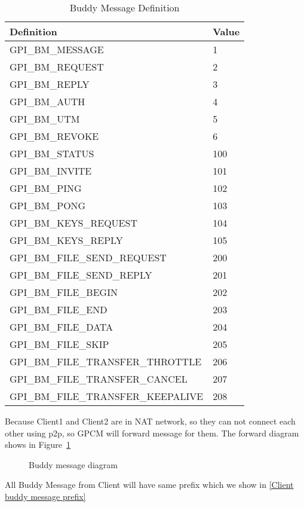 \documentclass[oneside,titlepage,a4paper]{Definition/retrospy} %
\begin{document}
\begin{table}[H]
	\centering
	\begin{tabular}{|l|l|}
		\hline 
		\textbf{Definition}&\textbf{Value} \\ 
		\hline 
 GPI\_BM\_MESSAGE&            1\\\hline
 GPI\_BM\_REQUEST     &               2\\\hline
 GPI\_BM\_REPLY        &            3  \\\hline
 GPI\_BM\_AUTH        &             4\\\hline
 GPI\_BM\_UTM            &            5\\\hline
 GPI\_BM\_REVOKE      &               6 \\\hline
 GPI\_BM\_STATUS       &          100			\\\hline			
 GPI\_BM\_INVITE           &       101\\\hline
 GPI\_BM\_PING             &      102\\\hline
 GPI\_BM\_PONG           &          103\\\hline
 GPI\_BM\_KEYS\_REQUEST        &    104\\\hline
 GPI\_BM\_KEYS\_REPLY            &   105\\\hline
 GPI\_BM\_FILE\_SEND\_REQUEST   &  200\\\hline
 GPI\_BM\_FILE\_SEND\_REPLY      &   201\\\hline
 GPI\_BM\_FILE\_BEGIN       &      202\\\hline
 GPI\_BM\_FILE\_END             &   203\\\hline
 GPI\_BM\_FILE\_DATA             & 204\\\hline
 GPI\_BM\_FILE\_SKIP          &      205\\\hline
 GPI\_BM\_FILE\_TRANSFER\_THROTTLE   &206\\\hline
 GPI\_BM\_FILE\_TRANSFER\_CANCEL&     207\\\hline
 GPI\_BM\_FILE\_TRANSFER\_KEEPALIVE &208\\\hline
	\end{tabular} 
	\caption{Buddy Message Definition}
	\label{Buddy Message Definition}
\end{table}
Because Client1 and Client2 are in NAT network, so they can not connect each other using p2p, so GPCM will forward message for them. The forward diagram shows in Figure~\ref{Buddy message diagram}
\begin{figure}[H]
	\centering
	\caption{Buddy message diagram}
	\label{Buddy message diagram}
\end{figure}
All Buddy Message from Client will have same prefix which we show in \ref{Client buddy message prefix}
\ClientRequest
\end{document}

